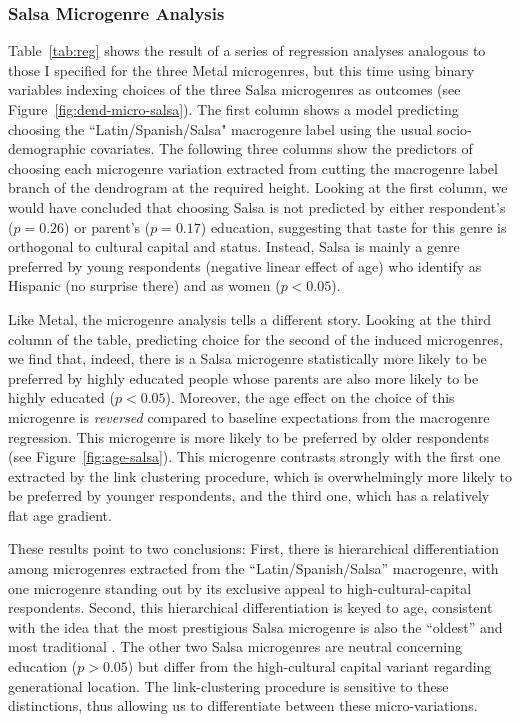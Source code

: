 \documentclass[a4paper,12pt]{extarticle}
\begin{document}
\subsubsection{Salsa Microgenre Analysis}
Table~\ref{tab:reg} shows the result of a series of regression analyses analogous to those I specified for the three Metal microgenres, but this time using binary variables indexing choices of the three Salsa microgenres as outcomes (see Figure~\ref{fig:dend-micro-salsa}). The first column shows a model predicting choosing the ``Latin/Spanish/Salsa" macrogenre label using the usual socio-demographic covariates. The following three columns show the predictors of choosing each microgenre variation extracted from cutting the macrogenre label branch of the dendrogram at the required height. Looking at the first column, we would have concluded that choosing Salsa is not predicted by either respondent's ($p = 0.26$) or parent's ($p = 0.17$) education, suggesting that taste for this genre is orthogonal to cultural capital and status. Instead, Salsa is mainly a genre preferred by young respondents (negative linear effect of age) who identify as Hispanic (no surprise there) and as women ($p < 0.05$). 

Like Metal, the microgenre analysis tells a different story. Looking at the third column of the table, predicting choice for the second of the induced microgenres, we find that, indeed, there is a Salsa microgenre statistically more likely to be preferred by highly educated people whose parents are also more likely to be highly educated ($p < 0.05$). Moreover, the age effect on the choice of this microgenre is \textit{reversed} compared to baseline expectations from the macrogenre regression. This microgenre is more likely to be preferred by older respondents (see Figure~\ref{fig:age-salsa}). This microgenre contrasts strongly with the first one extracted by the link clustering procedure, which is overwhelmingly more likely to be preferred by younger respondents, and the third one, which has a relatively flat age gradient. 

These results point to two conclusions: First, there is hierarchical differentiation among microgenres extracted from the ``Latin/Spanish/Salsa'' macrogenre, with one microgenre standing out by its exclusive appeal to high-cultural-capital respondents. Second, this hierarchical differentiation is keyed to age, consistent with the idea that the most prestigious Salsa microgenre is also the ``oldest'' and most traditional \citep{Bachmayer2014-pk}. The other two Salsa microgenres are neutral concerning education ($p > 0.05$) but differ from the high-cultural capital variant regarding generational location. The link-clustering procedure is sensitive to these distinctions, thus allowing us to differentiate between these micro-variations.
\end{document}
